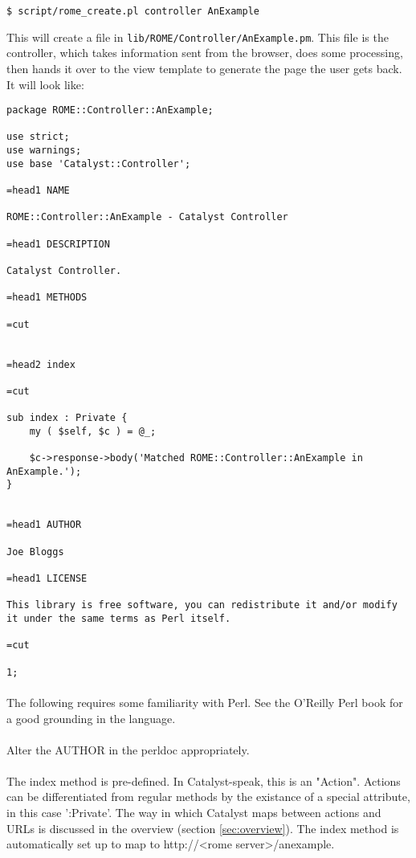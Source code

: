 \begin{verbatim}
$ script/rome_create.pl controller AnExample
\end{verbatim}

This will create a file in \verb|lib/ROME/Controller/AnExample.pm|. This file is the controller, which takes information sent from the browser, does some processing, then hands it over to the view template to generate the page the user gets back. It will look like:

\begin{verbatim}
package ROME::Controller::AnExample;

use strict;
use warnings;
use base 'Catalyst::Controller';

=head1 NAME

ROME::Controller::AnExample - Catalyst Controller

=head1 DESCRIPTION

Catalyst Controller.

=head1 METHODS

=cut


=head2 index 

=cut

sub index : Private {
    my ( $self, $c ) = @_;

    $c->response->body('Matched ROME::Controller::AnExample in AnExample.');
}


=head1 AUTHOR

Joe Bloggs

=head1 LICENSE

This library is free software, you can redistribute it and/or modify
it under the same terms as Perl itself.

=cut

1;

\end{verbatim}

\paragraph*{}
The following requires some familiarity with Perl. See the O'Reilly Perl book \citep{camel} for a good grounding in the language.

\paragraph*{}
Alter the AUTHOR in the perldoc appropriately.

\paragraph*{}
The index method is pre-defined. In Catalyst-speak, this is an "Action". Actions can be differentiated from regular methods by the existance of a special attribute, in this case ':Private'. The way in which Catalyst maps between actions and URLs is discussed in the overview (section \ref{sec:overview}). The index method is automatically set up to map to http://<rome server>/anexample.

